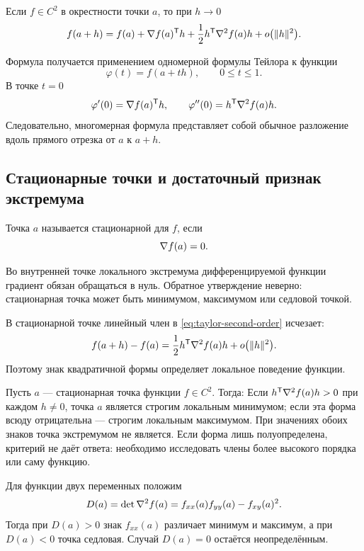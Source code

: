 \begin{theorem}
Если \(f\in C^2\) в окрестности точки \(a\), то при \(h\to0\)
\begin{equation}
 f(a+h)
 =
 f(a)
 +\nabla f(a)^{\mathsf{T}}h
 +\frac12 h^{\mathsf{T}}\nabla^{2}f(a)h
 +o\bigl(\lVert h\rVert^2\bigr).
\label{eq:taylor-second-order}
\end{equation}
\end{theorem}

Формула получается применением одномерной формулы Тейлора к функции
\[
\varphi(t)=f(a+th),
\qquad 0\leq t\leq1.
\]
В точке \(t=0\)
\[
\varphi'(0)=\nabla f(a)^{\mathsf{T}}h,
\qquad
\varphi''(0)=h^{\mathsf{T}}\nabla^{2}f(a)h.
\]
Следовательно, многомерная формула представляет собой обычное разложение вдоль прямого отрезка от \(a\) к \(a+h\).

\subsection{Стационарные точки и достаточный признак экстремума}

\begin{definition}
Точка \(a\) называется стационарной для \(f\), если
\[
\nabla f(a)=0.
\]
\end{definition}

Во внутренней точке локального экстремума дифференцируемой функции градиент обязан обращаться в нуль. Обратное утверждение неверно: стационарная точка может быть минимумом, максимумом или седловой точкой.

В стационарной точке линейный член в \eqref{eq:taylor-second-order} исчезает:
\[
f(a+h)-f(a)
=
\frac12 h^{\mathsf{T}}\nabla^{2}f(a)h
+o\bigl(\lVert h\rVert^2\bigr).
\]
Поэтому знак квадратичной формы определяет локальное поведение функции.

\begin{criterion}
Пусть \(a\) --- стационарная точка функции \(f\in C^2\). Тогда:
Если \(h^{\mathsf{T}}\nabla^{2}f(a)h>0\) при каждом \(h\neq0\), точка \(a\) является строгим локальным минимумом; если эта форма всюду отрицательна --- строгим локальным максимумом. При значениях обоих знаков точка экстремумом не является.
Если форма лишь полуопределена, критерий не даёт ответа: необходимо исследовать члены более высокого порядка или саму функцию.
\end{criterion}

Для функции двух переменных положим
\[
D(a)
=
\det\nabla^{2}f(a)
=
f_{xx}(a)f_{yy}(a)-f_{xy}(a)^2.
\]
Тогда при \(D(a)>0\) знак \(f_{xx}(a)\) различает минимум и максимум, а при \(D(a)<0\) точка седловая. Случай \(D(a)=0\) остаётся неопределённым.


